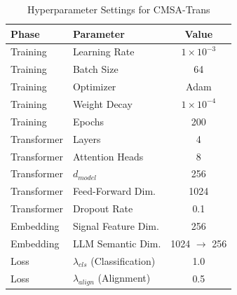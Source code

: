 \begin{table}[htbp]
\centering
\caption{Hyperparameter Settings for CMSA-Trans}
\label{tab:hyperparameters}
\begin{tabular}{llc}
\toprule
\textbf{Phase} & \textbf{Parameter} & \textbf{Value} \\
\midrule
Training & Learning Rate & $1 \times 10^{-3}$ \\
Training & Batch Size & 64 \\
Training & Optimizer & Adam \\
Training & Weight Decay & $1 \times 10^{-4}$ \\
Training & Epochs & 200 \\
\midrule
Transformer & Layers & 4 \\
Transformer & Attention Heads & 8 \\
Transformer & $d_{model}$ & 256 \\
Transformer & Feed-Forward Dim. & 1024 \\
Transformer & Dropout Rate & 0.1 \\
\midrule
Embedding & Signal Feature Dim. & 256 \\
Embedding & LLM Semantic Dim. & 1024 $\rightarrow$ 256 \\
\midrule
Loss & $\lambda_{cls}$ (Classification) & 1.0 \\
Loss & $\lambda_{align}$ (Alignment) & 0.5 \\
\bottomrule
\end{tabular}
\end{table}
